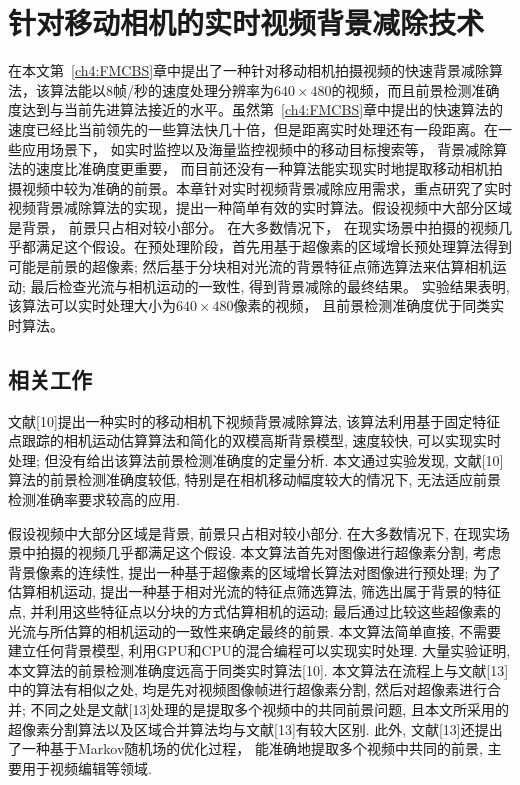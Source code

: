 \chapter{针对移动相机的实时视频背景减除技术}
在本文第~\ref{ch4:FMCBS}章中提出了一种针对移动相机拍摄视频的快速背景减除算法，该算法能以8帧/秒的速度处理分辨率为$640 \times 480$的视频，而且前景检测准确度达到与当前先进算法接近的水平。虽然第~\ref{ch4:FMCBS}章中提出的快速算法的速度已经比当前领先的一些算法\cite{gbsuperpixel}快几十倍，但是距离实时处理还有一段距离。在一些应用场景下， 如实时监控以及海量监控视频中的移动目标搜索等， 背景减除算法的速度比准确度更重要， 而目前还没有一种算法能实现实时地提取移动相机拍摄视频中较为准确的前景。本章针对实时视频背景减除应用需求，重点研究了实时视频背景减除算法的实现，提出一种简单有效的实时算法。假设视频中大部分区域是背景， 前景只占相对较小部分。 在大多数情况下， 在现实场景中拍摄的视频几乎都满足这个假设。在预处理阶段，首先用基于超像素的区域增长预处理算法得到可能是前景的超像素; 然后基于分块相对光流的背景特征点筛选算法来估算相机运动; 最后检查光流与相机运动的一致性, 得到背景减除的最终结果。 实验结果表明, 该算法可以实时处理大小为$640 \times 480$像素的视频， 且前景检测准确度优于同类实时算法。
 


\section{相关工作}
\label{ch5:sec:relatedWorks}
 文献[10]提出一种实时的移动相机下视频背景减除算法, 该算法利用基于固定特征点跟踪的相机运动估算算法和简化的双模高斯背景模型, 速度较快, 可以实现实时处理; 但没有给出该算法前景检测准确度的定量分析. 本文通过实验发现, 文献[10]算法的前景检测准确度较低, 特别是在相机移动幅度较大的情况下, 无法适应前景检测准确率要求较高的应用.

假设视频中大部分区域是背景, 前景只占相对较小部分. 在大多数情况下, 在现实场景中拍摄的视频几乎都满足这个假设. 本文算法首先对图像进行超像素分割, 考虑背景像素的连续性, 提出一种基于超像素的区域增长算法对图像进行预处理; 为了估算相机运动, 提出一种基于相对光流的特征点筛选算法, 筛选出属于背景的特征点, 并利用这些特征点以分块的方式估算相机的运动; 最后通过比较这些超像素的光流与所估算的相机运动的一致性来确定最终的前景. 本文算法简单直接, 不需要建立任何背景模型, 利用GPU和CPU的混合编程可以实现实时处理. 大量实验证明, 本文算法的前景检测准确度远高于同类实时算法[10]. 本文算法在流程上与文献[13]中的算法有相似之处, 均是先对视频图像帧进行超像素分割, 然后对超像素进行合并; 不同之处是文献[13]处理的是提取多个视频中的共同前景问题, 且本文所采用的超像素分割算法以及区域合并算法均与文献[13]有较大区别. 此外, 文献[13]还提出了一种基于Markov随机场的优化过程， 能准确地提取多个视频中共同的前景, 主要用于视频编辑等领域.
